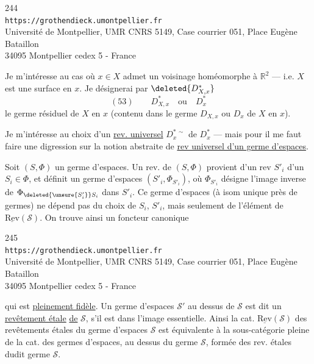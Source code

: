 
\begin{center}
244\\
\texttt{https://grothendieck.umontpellier.fr}\\
Université de Montpellier, UMR CNRS 5149, Case courrier 051, Place Eugène Bataillon\\
34095 Montpellier cedex 5 - France
\end{center}


 Je m'intéresse au cas où $x\in X$ admet un voisinage homéomorphe à $\mathbb R^2$ --- i.e. $X$ est une surface en $x$. Je désignerai par $\deleted{D_{X,x}^{*}}$
\[
(53)\qquad D_{X,x}^{*}\quad\text{ou}\quad D_x^{*}
\]
le germe résiduel de $X$ en $x$ (contenu dans le germe $D_{X,x}$ ou $D_x$ de $X$ en $x$).

Je m'intéresse au choix d'un \uline{rev. universel} $D_x^{*\,\sim}$ de $D_x^{*}$ --- mais pour  il me faut faire une digression sur la notion abstraite de \uline{rev universel d'un germe d'espaces}.

Soit $(S,\Phi)$ un germe d'espaces. Un rev. de $(S,\Phi)$ provient d'un rev $S'_i$ d'un $S_i\in\Phi$, et définit un germe d'espaces $(S'_i,\Phi_{S'_i})$, où $\Phi_{S'_i}$ désigne l'image inverse de $\Phi_{\deleted{\unsure{S'_i}}S_i}$ dans $S'_i$. Ce germe d'espaces  (à isom unique près de germes) ne dépend pas du choix de $S_i$, $S'_i$, mais seulement de l'élément de $\underline{\mathrm{Rev}}(\mathcal S)$. On trouve ainsi un foncteur canonique


\begin{center}
245\\
\texttt{https://grothendieck.umontpellier.fr}\\
Université de Montpellier, UMR CNRS 5149, Case courrier 051, Place Eugène Bataillon\\
34095 Montpellier cedex 5 - France
\end{center}



qui est \uline{pleinement fidèle}. Un germe d'espaces $\mathcal S'$ au dessus de $\mathcal S$ est dit  un \uline{revêtement étale} \uline{de} $\mathcal S$, s'il est dans l'image essentielle. Ainsi la cat. $\underline{\mathrm{Rev}}(\mathcal S)$ des revêtements étales du germe d'espaces $\mathcal S$ est équivalente à la sous-catégorie pleine de la  cat. des germes d'espaces, au dessus du germe $\mathcal S$,  formée des rev. étales dudit germe $\mathcal S$.

